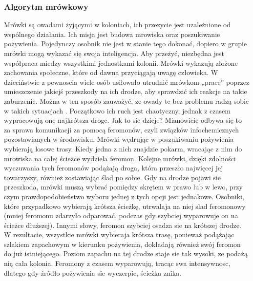\documentclass[12pt]{article} %
\begin{document}
\subsubsection{Algorytm mrówkowy}
Mrówki są owadami żyjącymi w koloniach, ich przezycie jest uzależnione od wspólnego działania. Ich misja jest budowa mrowiska oraz
poszukiwanie pożywienia. Pojedynczy osobnik nie jest w stanie tego dokonać, dopiero w grupie mrówki mogą wykazać się swoja inteligencja.
Aby przeżyć, niezbędna jest współpraca miedzy wszystkimi jednostkami
kolonii. Mrówki wykazują złożone zachowania społeczne, które od dawna przyciągają uwagę człowieka. W dzieciństwie z pewnoscia wiele osób usiłowało utrudnić mrówkom „prace” poprzez umieszczenie jakiejś przeszkody na ich drodze, aby sprawdzić ich reakcje na takie zaburzenie. Można w ten sposób zauważyć, ze owady te bez problemu radzą sobie w takich sytuacjach . Początkowo ich ruch jest chaotyczny, jednak z czasem wypracowują one najkrótsza droge. Jak to sie dzieje? Mianowicie odbywa się to za sprawa komunikacji za pomocą feromonów, czyli związków infochemicznych pozostawianych w środowisku. Mrówki wędrując w poszukiwaniu pożywienia wybierają losowe trasy.
Kiedy jedna z nich znajdzie pokarm, wracając z nim do mrowiska
na całej ścieżce wydziela feromon. Kolejne mrówki, dzięki zdolności wyczuwania tych feromonów podążają droga, która przeszło najwięcej jej
towarzyszy, również zostawiając ślad po sobie. Gdy na drodze pojawi sie przeszkoda, mrówki muszą wybrać pomiędzy skrętem w prawo lub
w lewo, przy czym prawdopodobieństwo wyboru jednej z tych opcji jest
jednakowe. Osobniki, które przypadkowo wybierają krótsza ścieżkę,
utrwalaja na niej slad feromonowy (mniej feromonu zdarzyło odparować,
podczas gdy szybciej wyparowuje on na ścieżce dłuższej). Innymi słowy,
feromon szybciej osadza sie na krótszej drodze. W rezultacie,
wszystkie mrówki wybieraja krótsza trasę, ponieważ podążając szlakiem
zapachowym w kierunku pożywienia, dokładają również swój feromon
do już istniejącego. Poziom zapachu na tej drodze staje sie tak wysoki,
ze podażą nią cała kolonia. Feromony z czasem wyparowują, tracąc
swa intensywnosc, dlatego gdy źródło pożywienia sie wyczerpie, ścieżka
znika.
\end{document}
